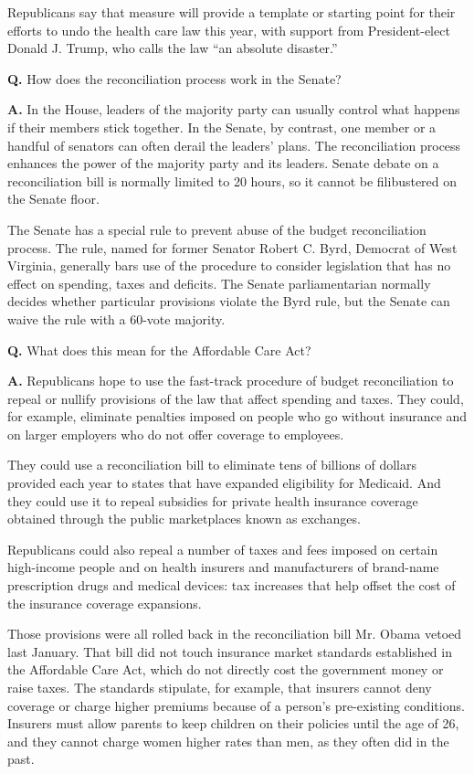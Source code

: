 Republicans say that measure will provide a template or starting point
for their efforts to undo the health care law this year, with support
from President-elect Donald J. Trump, who calls the law ``an absolute
disaster.''

\textbf{Q.} How does the reconciliation process work in the Senate?

\textbf{A.} In the House, leaders of the majority party can usually
control what happens if their members stick together. In the Senate, by
contrast, one member or a handful of senators can often derail the
leaders' plans. The reconciliation process enhances the power of the
majority party and its leaders. Senate debate on a reconciliation bill
is normally limited to 20 hours, so it cannot be filibustered on the
Senate floor.

The Senate has a special rule to prevent abuse of the budget
reconciliation process. The rule, named for former Senator Robert C.
Byrd, Democrat of West Virginia, generally bars use of the procedure to
consider legislation that has no effect on spending, taxes and deficits.
The Senate parliamentarian normally decides whether particular
provisions violate the Byrd rule, but the Senate can waive the rule with
a 60-vote majority.

\textbf{Q.} What does this mean for the Affordable Care Act?

\textbf{A.} Republicans hope to use the fast-track procedure of budget
reconciliation to repeal or nullify provisions of the law that affect
spending and taxes. They could, for example, eliminate penalties imposed
on people who go without insurance and on larger employers who do not
offer coverage to employees.

They could use a reconciliation bill to eliminate tens of billions of
dollars provided each year to states that have expanded eligibility for
Medicaid. And they could use it to repeal subsidies for private health
insurance coverage obtained through the public marketplaces known as
exchanges.

Republicans could also repeal a number of taxes and fees imposed on
certain high-income people and on health insurers and manufacturers of
brand-name prescription drugs and medical devices: tax increases that
help offset the cost of the insurance coverage expansions.

Those provisions were all rolled back in the reconciliation bill Mr.
Obama vetoed last January. That bill did not touch insurance market
standards established in the Affordable Care Act, which do not directly
cost the government money or raise taxes. The standards stipulate, for
example, that insurers cannot deny coverage or charge higher premiums
because of a person's pre-existing conditions. Insurers must allow
parents to keep children on their policies until the age of 26, and they
cannot charge women higher rates than men, as they often did in the
past.

